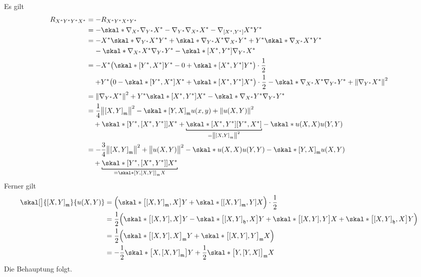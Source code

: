 \begin{beweis}
	Es gilt
	\begin{align}
		R_{X^*Y^*Y^*X^*} &= - R_{X^*Y^*X^*Y^*} \\
		&= - \skal*{\nabla_{X^*} \nabla_{Y^*} X^* - \nabla_{Y^*} \nabla_{X^*} X^* - \nabla_{\benbrace*{X^*,Y^*}}X^*}{Y^*} \\
		&= - X^* \skal*{\nabla_{Y^*} X^*}{Y^*} + \skal*{\nabla_{Y^*} X^*}{\nabla_{X^*} Y^*} + Y^* \skal*{\nabla_{X^*} X^*}{Y^*} \\
		&\hphantom{=}\,\, - \skal*{\nabla_{X^*} X^*}{\nabla_{Y^*} Y^*} - \skal*{\benbrace*{X^*,Y^*}}{\nabla_{Y^*} X^*} \\
		&= - X^* \enbrace[\big]{\skal*{\benbrace*{Y^*,X^*}}{Y^*} - 0+ \skal*{\benbrace*{X^*,Y^*}}{Y^*}} \cdot \frac{1}{2}\\
		&\hspace{1.3em} {+} Y^* \enbrace[\big]{0- \skal*{\benbrace*{Y^*,X^*}}{X^*} + \skal*{\benbrace*{X^*,Y^*}}{X^*}}  \cdot \frac{1}{2} -\skal*{\nabla_{X^*} X^*}{\nabla_{Y^*} Y^*} + \norm*{\nabla_{Y^*} X^*}^2 \\
		&= \norm*{\nabla_{Y^*} X^*}^2 + Y^* \skal*{ \benbrace*{X^*,Y^*}}{X^*} - \skal*{\nabla_{X^*} Y^*}{\nabla_{Y^*} Y^*} \\
		&= \frac{1}{4} \norm[\big]{\benbrace*{X,Y}_{\mathfrak{m}}}^2 - \skal*{\benbrace*{Y,X}_{\mathfrak{m}}}{u(x,y)} + \norm*{u(X,Y)}^2 \\
		&\hspace{1em} + \skal*{\benbrace*{Y^*, \benbrace*{X^*,Y^*}}}{X^*} + \Underbracket{\skal*{\benbrace*{X^*,Y^*}}{\benbrace*{Y^*,X^*}}}{=\norm*{\benbrace*{X,Y}_\mathfrak{m}}^2} - \skal*{u(X,X)}{u(Y,Y)} \\
		&= - \frac{3}{4} \norm[\big]{\benbrace*{X,Y}_\mathfrak{m}}^2  + \norm[\big]{u(X,Y)}^2 - \skal*{u(X,X)}{u(Y,Y)} - \skal*{\benbrace*{Y,X}_\mathfrak{m}}{u(X,Y)} \\
		&\hspace{1em} + \Underbracket{\skal*{\benbrace*{Y^*, \benbrace*{X^*,Y^*}}}{X^*}}{= \skal*{\benbrace*{Y, \benbrace*{X,Y}}_\mathfrak{m}}{X}} 
	\end{align}
	Ferner gilt
	\begin{align}
		\skal[\big]{\benbrace*{X,Y}_\mathfrak{m}}{u(X,Y)} &= \enbrace[\Big]{\skal*{\benbrace[\big]{\benbrace*{X,Y}_\mathfrak{m},X}}{Y} + \skal*{\benbrace*{\benbrace*{X,Y}_\mathfrak{m},Y}}{X}} \cdot \frac{1}{2}  \\
		&= \frac{1}{2} \enbrace[\Big]{\skal*{\benbrace[\big]{\benbrace*{X,Y},X}}{Y} - \skal*{\benbrace[\big]{\benbrace*{X,Y}_\mathfrak{h},X}}{Y} + \skal*{\benbrace[\big]{\benbrace*{X,Y},Y}}{X} + \skal*{\benbrace[\big]{\benbrace*{X,Y}_\mathfrak{h},X}}{Y}}   \\
		&= \frac{1}{2} \enbrace[\Big]{\skal*{\benbrace[\big]{\benbrace*{X,Y},X}_\mathfrak{m}}{Y} + \skal*{\benbrace[\big]{\benbrace*{X,Y},Y}_\mathfrak{m}}{X}} \\
		&= -\frac{1}{2}  \skal*{\benbrace[\big]{X,\benbrace*{X,Y}_\mathfrak{m}}}{Y} + \frac{1}{2} \skal*{\benbrace[\big]{Y,\benbrace*{Y,X}}_\mathfrak{m}}{X} 
	\end{align}
	Die Behauptung folgt.
\end{beweis}


